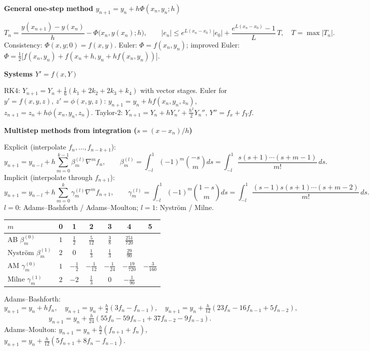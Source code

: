 \documentclass[10pt,a4paper]{article}
\newcommand{\head}[1]{\par\smallskip\noindent\textbf{\color{blue!50!black}#1}\par\nobreak}
\begin{document}
\head{General one-step method \(y_{n+1}=y_n+h\Phi(x_n,y_n;h)\)}
\[
  T_n=\frac{y(x_{n+1})-y(x_n)}{h}-\Phi\bigl(x_n,y(x_n);h\bigr),
  \qquad
  |e_n|\le e^{L(x_n-x_0)}|e_0|+\frac{e^{L(x_n-x_0)}-1}{L}\,T,
  \quad T=\max|T_n|.
\]
Consistency: \(\Phi(x,y;0)=f(x,y)\).
Euler: \(\Phi=f(x_n,y_n)\); improved Euler:
\(\Phi=\frac12\bigl[f(x_n,y_n)+f(x_n+h,y_n+hf(x_n,y_n))\bigr]\).

\head{Systems \(Y'=f(x,Y)\)}
RK4: \(Y_{n+1}=Y_n+\frac16(k_1+2k_2+2k_3+k_4)\) with vector stages.
Euler for \(y'=f(x,y,z)\), \(z'=\phi(x,y,z)\):
\(y_{n+1}=y_n+hf(x_n,y_n,z_n)\), \(z_{n+1}=z_n+h\phi(x_n,y_n,z_n)\).
Taylor-2: \(Y_{n+1}=Y_n+hY_n'+\frac{h^2}2Y_n''\), \(Y''=f_x+f_Yf\).

\head{Multistep methods from integration (\(s=(x-x_n)/h\))}
Explicit (interpolate \(f_n,\dots,f_{n-k+1}\)):
\[
  y_{n+1}=y_{n-l}+h\sum_{m=0}^{k-1}\beta_m^{(l)}\nabla^mf_n,
  \qquad
  \beta_m^{(l)}=\int_{-l}^1(-1)^m\binom{-s}{m}ds
  =\int_{-l}^1\frac{s(s+1)\cdots(s+m-1)}{m!}\,ds .
\]
Implicit (interpolate through \(f_{n+1}\)):
\[
  y_{n+1}=y_{n-l}+h\sum_{m=0}^{k}\gamma_m^{(l)}\nabla^mf_{n+1},
  \qquad
  \gamma_m^{(l)}=\int_{-l}^1(-1)^m\binom{1-s}{m}ds
  =\int_{-l}^1\frac{(s-1)s(s+1)\cdots(s+m-2)}{m!}\,ds .
\]
\(l=0\): Adams--Bashforth / Adams--Moulton; \(l=1\): Nystr\"om / Milne.
\begin{center}
\renewcommand{\arraystretch}{1.3}
\begin{tabular}{@{}lcccccc@{}}
\toprule
\(m\) & 0 & 1 & 2 & 3 & 4 & 5\\
\midrule
AB \(\beta_m^{(0)}\) & \(1\) & \(\frac12\) & \(\frac5{12}\) & \(\frac38\) & \(\frac{251}{720}\) & \\
Nystr\"om \(\beta_m^{(1)}\) & \(2\) & \(0\) & \(\frac13\) & \(\frac13\) & \(\frac{29}{90}\) & \\
AM \(\gamma_m^{(0)}\) & \(1\) & \(-\frac12\) & \(-\frac1{12}\) & \(-\frac1{24}\) & \(-\frac{19}{720}\) & \(-\frac3{160}\)\\
Milne \(\gamma_m^{(1)}\) & \(2\) & \(-2\) & \(\frac13\) & \(0\) & \(-\frac1{90}\) & \\
\bottomrule
\end{tabular}
\end{center}
Adams--Bashforth:
\[
  y_{n+1}=y_n+hf_n,\quad
  y_{n+1}=y_n+\tfrac h2(3f_n-f_{n-1}),\quad
  y_{n+1}=y_n+\tfrac h{12}(23f_n-16f_{n-1}+5f_{n-2}),
\]
\[
  y_{n+1}=y_n+\tfrac h{24}(55f_n-59f_{n-1}+37f_{n-2}-9f_{n-3}).
\]
Adams--Moulton:
\(y_{n+1}=y_n+\frac h2(f_{n+1}+f_n)\),\quad
\(y_{n+1}=y_n+\frac h{12}(5f_{n+1}+8f_n-f_{n-1})\).
\end{document}
